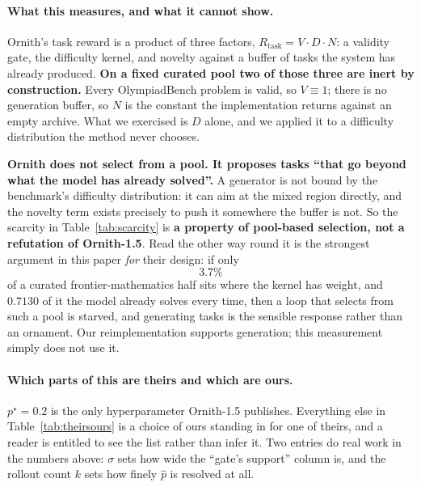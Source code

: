 \paragraph{What this measures, and what it cannot show.}
\label{sec:gatescope}
Ornith's task reward is a product of three factors, $R_{\mathrm{task}}=V\cdot D\cdot N$: a
validity gate, the difficulty kernel, and novelty against a buffer of tasks the system has
already produced. \textbf{On a fixed curated pool two of those three are inert by
construction.} Every OlympiadBench problem is valid, so $V\equiv1$; there is no generation
buffer, so $N$ is the constant the implementation returns against an empty archive. What we
exercised is $D$ alone, and we applied it to a difficulty distribution the method never
chooses.

\textbf{Ornith does not select from a pool. It proposes tasks ``that go beyond what the model
has already solved''.} A generator is not bound by the benchmark's difficulty distribution: it
can aim at the mixed region directly, and the novelty term exists precisely to push it
somewhere the buffer is not. So the scarcity in Table~\ref{tab:scarcity} is \textbf{a property
of pool-based selection, not a refutation of Ornith-1.5}. Read the other way round it is the
strongest argument in this paper \emph{for} their design: if only $$3.7\%$$ of a curated
frontier-mathematics half sits where the kernel has weight, and $0.7130$ of it the model
already solves every time, then a loop that selects from such a pool is starved, and
generating tasks is the sensible response rather than an ornament. Our reimplementation
supports generation; this measurement simply does not use it.

\paragraph{Which parts of this are theirs and which are ours.} $p^\star=0.2$ is the only
hyperparameter Ornith-1.5 publishes. Everything else in Table~\ref{tab:theirsours} is a choice
of ours standing in for one of theirs, and a reader is entitled to see the list rather than
infer it. Two entries do real work in the numbers above: $\sigma$ sets how wide the ``gate's
support'' column is, and the rollout count $k$ sets how finely $\hat p$ is resolved at all.

